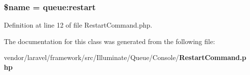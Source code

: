 \subsubsection[{\$name}]{\setlength{\rightskip}{0pt plus 5cm}\${\bf name} = \textquotesingle{}queue\+:restart\textquotesingle{}\hspace{0.3cm}{\ttfamily [protected]}}\label{class_illuminate_1_1_queue_1_1_console_1_1_restart_command_ab2fc40d43824ea3e1ce5d86dee0d763b}


Definition at line 12 of file Restart\+Command.\+php.



The documentation for this class was generated from the following file\+:\begin{DoxyCompactItemize}
\item 
vendor/laravel/framework/src/\+Illuminate/\+Queue/\+Console/{\bf Restart\+Command.\+php}\end{DoxyCompactItemize}
